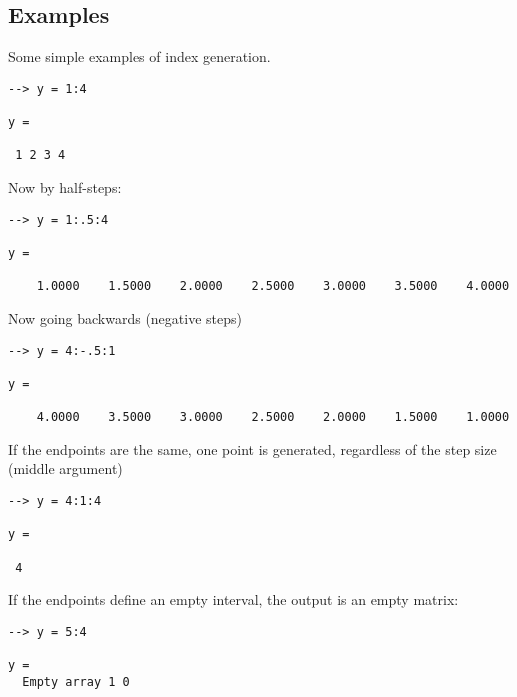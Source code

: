\subsection{Examples}

Some simple examples of index generation.
\begin{verbatim}
--> y = 1:4

y = 

 1 2 3 4 
\end{verbatim}
Now by half-steps:
\begin{verbatim}
--> y = 1:.5:4

y = 

    1.0000    1.5000    2.0000    2.5000    3.0000    3.5000    4.0000 
\end{verbatim}
Now going backwards (negative steps)
\begin{verbatim}
--> y = 4:-.5:1

y = 

    4.0000    3.5000    3.0000    2.5000    2.0000    1.5000    1.0000 
\end{verbatim}
If the endpoints are the same, one point is generated, regardless of the step size (middle argument)
\begin{verbatim}
--> y = 4:1:4

y = 

 4 
\end{verbatim}
If the endpoints define an empty interval, the output is an empty matrix:
\begin{verbatim}
--> y = 5:4

y = 
  Empty array 1 0
\end{verbatim}
